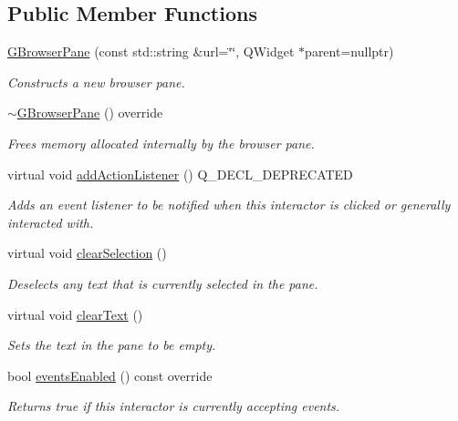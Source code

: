 \subsection*{Public Member Functions}
\begin{DoxyCompactItemize}
\item 
\mbox{\hyperlink{classGBrowserPane_a8f540c6f1aab2b4278bea6b1139aa470}{G\+Browser\+Pane}} (const std\+::string \&url=\char`\"{}\char`\"{}, Q\+Widget $\ast$parent=nullptr)
\begin{DoxyCompactList}\small\item\em Constructs a new browser pane. \end{DoxyCompactList}\item 
\mbox{\hyperlink{classGBrowserPane_ad2b090c6d23fd1019afa2a16e9eb1680}{$\sim$\+G\+Browser\+Pane}} () override
\begin{DoxyCompactList}\small\item\em Frees memory allocated internally by the browser pane. \end{DoxyCompactList}\item 
virtual void \mbox{\hyperlink{classGInteractor_a02f20ea6edfa0671f31c4c648a253833}{add\+Action\+Listener}} () Q\+\_\+\+D\+E\+C\+L\+\_\+\+D\+E\+P\+R\+E\+C\+A\+T\+ED
\begin{DoxyCompactList}\small\item\em Adds an event listener to be notified when this interactor is clicked or generally interacted with. \end{DoxyCompactList}\item 
virtual void \mbox{\hyperlink{classGBrowserPane_abd07e172ccec6823a88289c21124a367}{clear\+Selection}} ()
\begin{DoxyCompactList}\small\item\em Deselects any text that is currently selected in the pane. \end{DoxyCompactList}\item 
virtual void \mbox{\hyperlink{classGBrowserPane_a25f53c7d92eb2a5197cd4418c0165367}{clear\+Text}} ()
\begin{DoxyCompactList}\small\item\em Sets the text in the pane to be empty. \end{DoxyCompactList}\item 
bool \mbox{\hyperlink{classGInteractor_a597a370b592e3737d38d9d2f4e2031ea}{events\+Enabled}} () const override
\begin{DoxyCompactList}\small\item\em Returns true if this interactor is currently accepting events. \end{DoxyCompactList}\item 

\end{DoxyCompactItemize}
